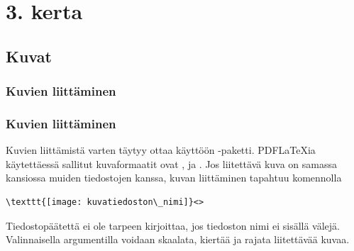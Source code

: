 \section{3. kerta}


\subsection{Kuvat}

\subsubsection{Kuvien liittäminen}
\begin{fframe}
    \frametitle{Kuvien liittäminen}
    Kuvien liittämistä varten täytyy ottaa käyttöön -paketti. 
    \pause
    \vaihto
    PDFLaTeXia käytettäessä sallitut kuvaformaatit ovat ,  ja . 
    \pause
    \vaihto
    Jos liitettävä kuva on samassa kansiossa muiden tiedostojen kanssa, kuvan liittäminen tapahtuu komennolla
    \begin{lstlisting}
\texttt{[image: kuvatiedoston\_nimi]}<>
    \end{lstlisting}
    Tiedostopäätettä ei ole tarpeen kirjoittaa, jos tiedoston nimi ei sisällä välejä.
    \pause
    \vaihto
    Valinnaisella argumentilla voidaan skaalata, kiertää ja rajata liitettävää kuvaa. 
\end{fframe}

